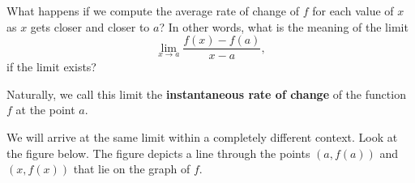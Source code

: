 \documentclass{ximera}
\begin{document}
What happens if we compute the average rate of change of $f$  for each value of $x$ as $x$ gets closer and closer to $a$? In other words, what is the meaning of the limit
\[
     \lim_{x\to a} \frac{f(x)-f(a)}{x-a},
    \] 
    if the limit exists?
    
Naturally, we call this limit the \textbf{instantaneous rate of change} of the function $f$ at the point $a$.

We will arrive at the same limit within a completely different context. Look at the figure below.
The figure depicts a  line  through the points $(a,f(a))$ and $(x,f(x))$ that lie on the graph of $f$.
\begin{comment}
\begin{image}
\begin{tikzpicture}
	
          \begin{axis}[
            clip=false, domain=0:2.5, axis lines =middle, xlabel=$x$,
            ylabel=$y$, every axis y label/.style={at=(current
              axis.above origin),anchor=south}, 
             width=4in,
          ticks=none ]   
                             \addplot [thick, penColor,smooth] {(x-1)^2 };
      
     
                     
           \node at (axis cs:0,-0.1) {$0$};
        
           
               \addplot[only marks,very thick,penColor,mark=*]
	        coordinates{(1.65,0.43)};
	        \addplot[only marks,very thick,penColor,mark=*]
	        coordinates{(2,1)};
            
                \addplot [ thick,penColor3]  plot coordinates {(1.394,0) (2.5,1.825)};
           
	        \addplot[only marks,very thick,penColor,mark=*]
	        coordinates{(2,1)};
               
      \addplot[only marks,penColor,mark=*]
	        coordinates{(2,0)};
            \addplot[only marks,penColor,mark=*]
	        coordinates{(1.65,0)};

               \node at (axis cs:1.65,-0.1) {$a$ };
                \node at (axis cs:1.2,1.8) {slope of the secant line $=\frac{\Delta y}{\Delta x}=\frac{f(x)-f(a)}{x-a}$ };
               \node at (axis cs:2,-0.1) {$x$ };
                 \node at (axis cs:2.3,1) {$(x,f(x))$ };
                  \node at (axis cs:1.4,0.45) {$(a,f(a))$ };
                   \node at (axis cs:2.6,1.5) { secant line  };
        \end{axis}
\end{tikzpicture}
\end{image}
\end{comment}
\end{document}
